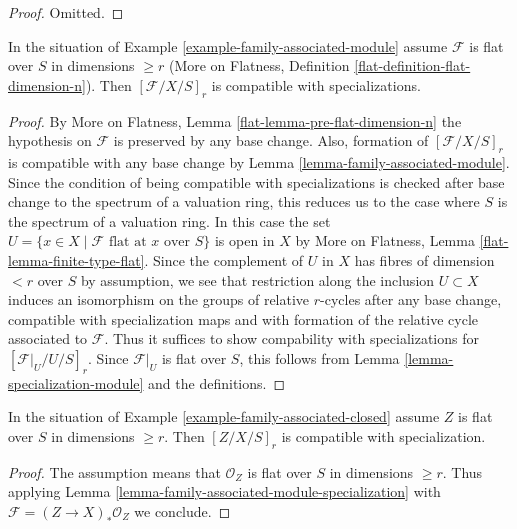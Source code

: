 \begin{proof}
Omitted.
\end{proof}

\begin{lemma}
\label{lemma-family-associated-module-specialization}
In the situation of Example \ref{example-family-associated-module}
assume $\mathcal{F}$ is flat over $S$ in dimensions $\geq r$
(More on Flatness, Definition \ref{flat-definition-flat-dimension-n}).
Then $[\mathcal{F}/X/S]_r$ is compatible with specializations.
\end{lemma}

\begin{proof}
By More on Flatness, Lemma \ref{flat-lemma-pre-flat-dimension-n}
the hypothesis on $\mathcal{F}$ is preserved by any base change.
Also, formation of $[\mathcal{F}/X/S]_r$ is compatible with any
base change by Lemma \ref{lemma-family-associated-module}.
Since the condition of being compatible with specializations
is checked after base change to the spectrum of a valuation ring,
this reduces us to the case where $S$ is the spectrum of a valuation ring.
In this case the set
$U = \{x \in X \mid \mathcal{F}\text{ flat at }x\text{ over }S\}$
is open in $X$ by
More on Flatness, Lemma \ref{flat-lemma-finite-type-flat}.
Since the complement of $U$ in $X$ has fibres of dimension $< r$ over
$S$ by assumption, we see that restriction along the inclusion
$U \subset X$ induces an isomorphism on the groups of relative $r$-cycles
after any base change, compatible with specialization maps and with
formation of the relative cycle associated to $\mathcal{F}$.
Thus it suffices to show compability with
specializations for $[\mathcal{F}|_U / U /S]_r$.
Since $\mathcal{F}|_U$ is flat over $S$, this follows from
Lemma \ref{lemma-specialization-module} and the definitions.
\end{proof}

\begin{lemma}
\label{lemma-family-associated-closed-specialization}
In the situation of Example \ref{example-family-associated-closed}
assume $Z$ is flat over $S$ in dimensions $\geq r$.
Then $[Z/X/S]_r$ is compatible with specialization.
\end{lemma}

\begin{proof}
The assumption means that $\mathcal{O}_Z$ is flat over $S$ in
dimensions $\geq r$. Thus applying
Lemma \ref{lemma-family-associated-module-specialization}
with $\mathcal{F} = (Z \to X)_*\mathcal{O}_Z$ we conclude.
\end{proof}

